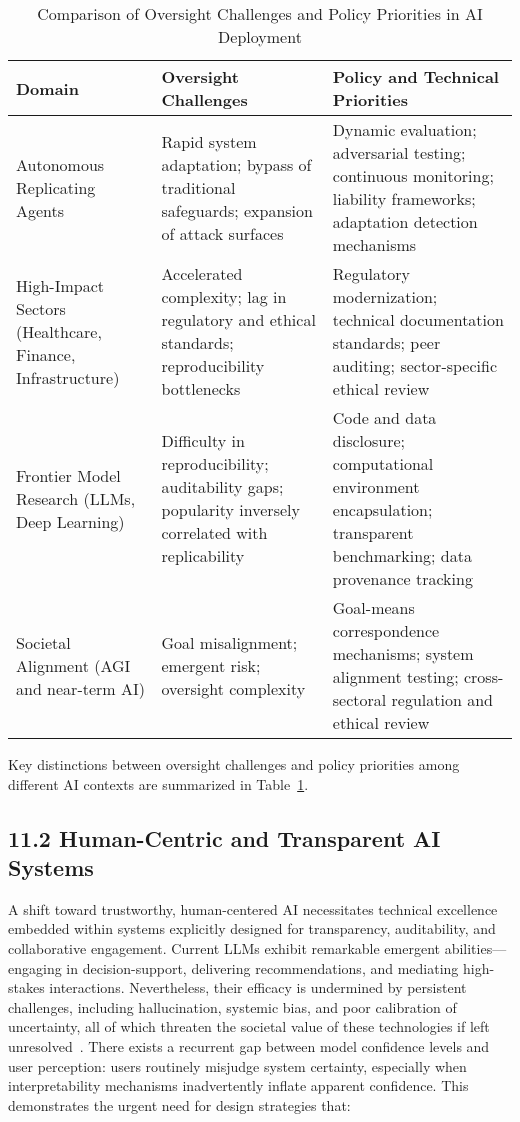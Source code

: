 \documentclass[11pt]{article}
\begin{document}
\begin{table}[htbp]
\centering
\caption{Comparison of Oversight Challenges and Policy Priorities in AI Deployment}
\label{tab:oversight_policy_comparison}
\begin{tabular}{|p{4.2cm}|p{5.2cm}|p{5.2cm}|}
\hline
\textbf{Domain} & \textbf{Oversight Challenges} & \textbf{Policy and Technical Priorities} \\
\hline
Autonomous Replicating Agents & Rapid system adaptation; bypass of traditional safeguards; expansion of attack surfaces & Dynamic evaluation; adversarial testing; continuous monitoring; liability frameworks; adaptation detection mechanisms \\ \hline
High-Impact Sectors (Healthcare, Finance, Infrastructure) & Accelerated complexity; lag in regulatory and ethical standards; reproducibility bottlenecks & Regulatory modernization; technical documentation standards; peer auditing; sector-specific ethical review \\ \hline
Frontier Model Research (LLMs, Deep Learning) & Difficulty in reproducibility; auditability gaps; popularity inversely correlated with replicability & Code and data disclosure; computational environment encapsulation; transparent benchmarking; data provenance tracking \\ \hline
Societal Alignment (AGI and near-term AI) & Goal misalignment; emergent risk; oversight complexity & Goal-means correspondence mechanisms; system alignment testing; cross-sectoral regulation and ethical review  \\ \hline
\end{tabular}
\end{table}

Key distinctions between oversight challenges and policy priorities among different AI contexts are summarized in Table~\ref{tab:oversight_policy_comparison}.

\subsection{11.2 Human-Centric and Transparent AI Systems}

A shift toward trustworthy, human-centered AI necessitates technical excellence embedded within systems explicitly designed for transparency, auditability, and collaborative engagement. Current LLMs exhibit remarkable emergent abilities—engaging in decision-support, delivering recommendations, and mediating high-stakes interactions. Nevertheless, their efficacy is undermined by persistent challenges, including hallucination, systemic bias, and poor calibration of uncertainty, all of which threaten the societal value of these technologies if left unresolved~\cite{ref35,ref39,ref42,ref46}. There exists a recurrent gap between model confidence levels and user perception: users routinely misjudge system certainty, especially when interpretability mechanisms inadvertently inflate apparent confidence. This demonstrates the urgent need for design strategies that:
\end{document}
